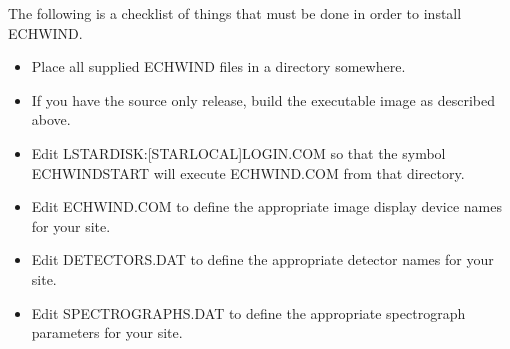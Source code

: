 The following is a checklist of things that must be done in order to install
ECHWIND.
\begin{itemize}
\item Place all supplied ECHWIND files in a directory somewhere.
\item If you have the source only release, build the executable image as
described above.
\item Edit LSTARDISK:[STARLOCAL]LOGIN.COM so that the symbol ECHWINDSTART will
execute ECHWIND.COM from that directory.
\item Edit ECHWIND.COM to define the appropriate image display device names for
your site.
\item Edit DETECTORS.DAT to define the appropriate detector names for your
site.
\item Edit SPECTROGRAPHS.DAT to define the appropriate spectrograph parameters
for your site.
\end{itemize}


